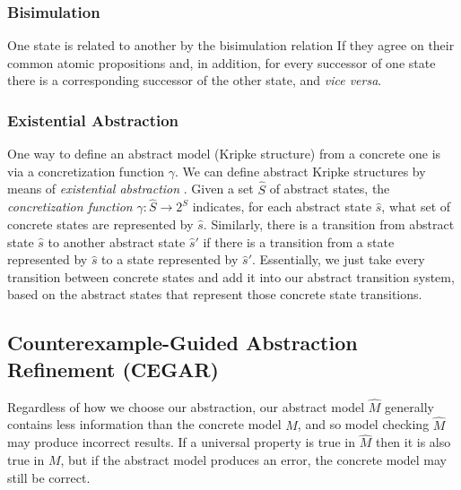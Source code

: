 \documentclass[10pt,a4paper]{article}
\begin{document}
\subsubsection*{Bisimulation}

One state is related to another by the bisimulation relation If they agree on their common atomic propositions and, in addition, for every successor of one state there is a corresponding successor of the other state, and \textit{vice versa}.

\subsubsection*{Existential Abstraction}

One way to define an abstract model (Kripke structure) from a concrete one is via a concretization function $\gamma$. We can define abstract Kripke structures by means of \textit{existential abstraction} \cite{94mcabs}. Given a set $\widehat{S}$ of abstract states, the \textit{concretization function} $\gamma : \widehat{S} \rightarrow 2^S$ indicates, for each abstract state $\widehat{s}$, what set of concrete states are represented by $\widehat{s}$. Similarly, there is a transition from abstract state $\widehat{s}$ to another abstract state $\widehat{s}'$ if there is a transition from a state represented by $\widehat{s}$ to a state represented by $\widehat{s}'$. Essentially, we just take every transition between concrete states and add it into our abstract transition system, based on the abstract states that represent those concrete state transitions.

\subsection*{Counterexample-Guided Abstraction Refinement (CEGAR)}


Regardless of how we choose our abstraction, our abstract model $\widehat{M}$ generally contains less information than the concrete model $M$, and so model checking $\widehat{M}$ may produce incorrect results. If a universal property is true in $\widehat{M}$ then it is also true in $M$, but if the abstract model produces an error, the concrete model may still be correct.
\end{document}
